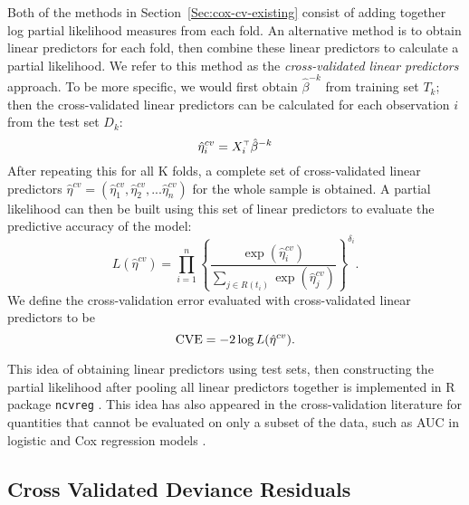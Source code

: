 \par Both of the methods in Section~\ref{Sec:cox-cv-existing} consist of adding together log partial likelihood measures from each fold.  An alternative method is to obtain linear predictors for each fold, then combine these linear predictors to calculate a partial likelihood. We refer to this method as the \emph{cross-validated linear predictors} approach. To be more specific, we would first obtain $\hat{\beta}^{-k}$ from training set $T_{k}$; then the cross-validated linear predictors can be calculated for each observation $i$ from the test set $D_k$:  
\begin{equation}
  \label{eq:cv-lp}
  \hat{\eta}^{cv}_{i} = X_{i}^{\scriptscriptstyle\top}\hat{\beta}^{-k}
\end{equation} 
After repeating this for all K folds, a complete set of cross-validated linear predictors $\hat{\eta}^{cv} = ( \hat{\eta}^{cv}_{1},  \hat{\eta}^{cv}_{2} , ...  \hat{\eta}^{cv}_{n})$ for the whole sample is obtained. A partial likelihood can then be built using this set of linear predictors to evaluate the predictive accuracy of the model: 
	\begin{equation} 
	L(\hat{\eta}^{cv}) = \prod_{i=1}^{n} \left\{ \frac{\exp (\hat{\eta}^{cv}_{i})}{\sum_{ j \in R(t_{i})}\exp (\hat{\eta}^{cv}_{j})} \right\} ^{\delta_i}.
	\end{equation}
We define the cross-validation error evaluated with cross-validated linear predictors to be $$\textrm{CVE} = - 2 \log L(\hat{\eta}^{cv}).$$
  
\par This idea of obtaining linear predictors using test sets, then constructing the partial likelihood after pooling all linear predictors together is implemented in R package \texttt{ncvreg} \citep{ncvreg}. This idea has also appeared in the cross-validation literature for quantities that cannot be evaluated on only a subset of the data, such as AUC in logistic and Cox regression models \citep{Parker2007,Simon2011a,Subramanian2011}.

\subsection{Cross Validated Deviance Residuals}

